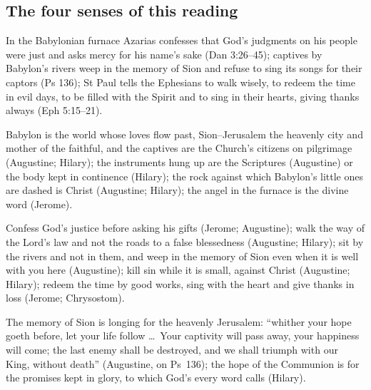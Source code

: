 \subsection{The four senses of this reading}

\begin{fourSenses}
\item[Literal.] In the Babylonian furnace Azarias confesses that God's
judgments on his people were just and asks mercy for his name's sake (Dan
3:26--45); captives by Babylon's rivers weep in the memory of Sion and refuse
to sing its songs for their captors (Ps 136); St Paul tells the Ephesians to
walk wisely, to redeem the time in evil days, to be filled with the Spirit and
to sing in their hearts, giving thanks always (Eph 5:15--21).

\item[Allegorical.] Babylon is the world whose loves flow past, Sion--Jerusalem
the heavenly city and mother of the faithful, and the captives are the Church's
citizens on pilgrimage (Augustine; Hilary); the instruments hung up are the
Scriptures (Augustine) or the body kept in continence (Hilary); the rock
against which Babylon's little ones are dashed is Christ (Augustine; Hilary);
the angel in the furnace is the divine word (Jerome).

\item[Moral.] Confess God's justice before asking his gifts (Jerome;
Augustine); walk the way of the Lord's law and not the roads to a false
blessedness (Augustine; Hilary); sit by the rivers and not in them, and weep in
the memory of Sion even when it is well with you here (Augustine); kill sin
while it is small, against Christ (Augustine; Hilary); redeem the time by good
works, sing with the heart and give thanks in loss (Jerome; Chrysostom).

\item[Anagogical.] The memory of Sion is longing for the heavenly Jerusalem:
``whither your hope goeth before, let your life follow \dots\ Your captivity
will pass away, your happiness will come; the last enemy shall be destroyed,
and we shall triumph with our King, without death'' (Augustine, on Ps~136); the
hope of the Communion is for the promises kept in glory, to which God's every
word calls (Hilary).
\end{fourSenses}
